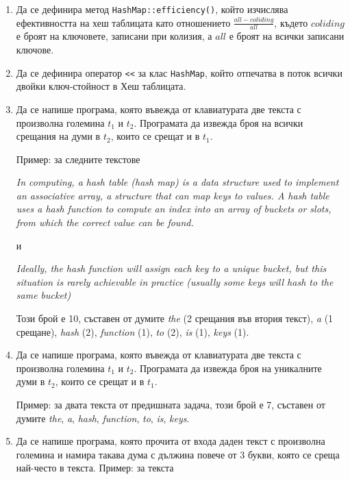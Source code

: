 \documentclass[12pt,a4paper]{article}
\begin{document}
\begin{enumerate}

  \item Да се дефинира метод \texttt{HashMap::efficiency()}, който изчислява ефективността на хеш таблицата като отношението  $\frac{all-coliding}{all}$, където $coliding$ е броят на ключовете, записани при колизия, а $all$ е броят на всички записани ключове.


  \item Да се дефинира оператор \texttt{<}\texttt{<} за клас \texttt{HashMap}, който отпечатва в поток всички двойки ключ-стойност в Хеш таблицата.

  \item Да се напише програма, която въвежда от клавиатурата две текста с произволна големина $t_1$ и $t_2$. Програмата да извежда броя на всички срещания на думи в $t_2$, които се срещат и в $t_1$.

  Пример: за следните текстове

  \textit{In computing, a hash table (hash map) is a data structure used to implement an associative array, a structure that can map keys to values. A hash table uses a hash function to compute an index into an array of buckets or slots, from which the correct value can be found.}

  и

  \textit{Ideally, the hash function will assign each key to a unique bucket, but this situation is rarely achievable in practice (usually some keys will hash to the same bucket)}

  Този брой е 10, съставен от думите \textit {the} (2 срещания във втория текст), \textit{a} (1 срещане), \textit{hash} (2), \textit {function} (1), \textit{to} (2), \textit{is} (1), \textit{keys} (1).


  \item Да се напише програма, която въвежда от клавиатурата две текста с произволна големина $t_1$ и $t_2$. Програмата да извежда броя на уникалните думи в $t_2$, които се срещат и в $t_1$.

  Пример: за двата текста от предишната задача, този брой е 7, съставен от думите \textit {the}, \textit{a}, \textit{hash}, \textit {function}, \textit{to}, \textit{is}, \textit{keys}.


  \item Да се напише програма, която прочита от входа даден текст с произволна големина и намира такава дума с дължина повече от 3 букви, която се среща най-често в текста. Пример: за текста


\end{enumerate}
\end{document}
